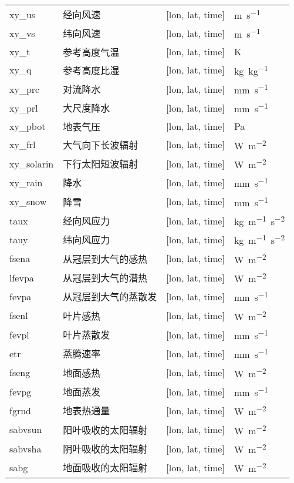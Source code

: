 \documentclass[a4paper,12pt,twoside]{article}
\begin{document}
\begin{longtable}[htbp]{lp{}p{}l}
xy\_us & 经向风速 & {[}lon, lat, time{]} & \unit{m.s^{-1}} \\
xy\_vs & 纬向风速 & {[}lon, lat, time{]} & \unit{m.s^{-1}} \\
xy\_t & 参考高度气温 & {[}lon, lat, time{]}  & K \\
xy\_q & 参考高度比湿 & {[}lon, lat, time{]}  & \unit{kg.kg^{-1}} \\
xy\_prc & 对流降水 & {[}lon, lat, time{]}  & \unit{mm.s^{-1}} \\
xy\_prl & 大尺度降水 & {[}lon, lat, time{]}  & \unit{mm.s^{-1}} \\
xy\_pbot & 地表气压 & {[}lon, lat, time{]}  & Pa \\
xy\_frl & 大气向下长波辐射 & {[}lon, lat, time{]}  & \unit{W.m^{-2}} \\
xy\_solarin & 下行太阳短波辐射 & {[}lon, lat, time{]}  & \unit{W.m^{-2}} \\
xy\_rain & 降水 & {[}lon, lat, time{]}  & \unit{mm.s^{-1}} \\
xy\_snow & 降雪 & {[}lon, lat, time{]}  & \unit{mm.s^{-1}} \\
taux & 经向风应力 & {[}lon, lat, time{]}  & \unit{kg.m^{-1}.s^{-2}} \\
tauy & 纬向风应力 & {[}lon, lat, time{]}  & \unit{kg.m^{-1}.s^{-2}} \\
fsena & 从冠层到大气的感热 & {[}lon, lat, time{]}  & \unit{W.m^{-2}} \\
lfevpa & 从冠层到大气的潜热 & {[}lon, lat, time{]}  & \unit{W.m^{-2}} \\
fevpa & 从冠层到大气的蒸散发 & {[}lon, lat, time{]}  & \unit{mm.s^{-1}} \\
fsenl & 叶片感热 & {[}lon, lat, time{]}  & \unit{W.m^{-2}} \\
fevpl & 叶片蒸散发 & {[}lon, lat, time{]}  & \unit{mm.s^{-1}} \\
etr & 蒸腾速率 & {[}lon, lat, time{]}  & \unit{mm.s^{-1}} \\
fseng & 地面感热 & {[}lon, lat, time{]}  & \unit{W.m^{-2}} \\
fevpg & 地面蒸发 & {[}lon, lat, time{]}  & \unit{mm.s^{-1}} \\
fgrnd & 地表热通量 & {[}lon, lat, time{]}  & \unit{W.m^{-2}} \\
sabvsun & 阳叶吸收的太阳辐射 & {[}lon, lat, time{]}  & \unit{W.m^{-2}} \\
sabvsha & 阴叶吸收的太阳辐射 & {[}lon, lat, time{]}  & \unit{W.m^{-2}} \\
sabg & 地面吸收的太阳辐射 & {[}lon, lat, time{]}  & \unit{W.m^{-2}} \\

\end{longtable}
\end{document}
